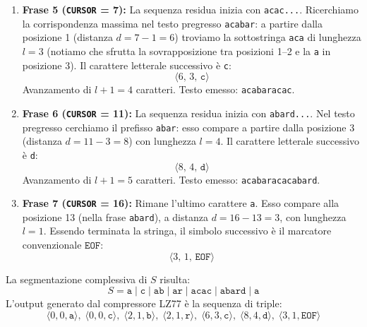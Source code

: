\begin{enumerate}
  \item \textbf{Frase 5 (\texttt{CURSOR} = 7):} La sequenza residua inizia con \texttt{acac...}. Ricerchiamo la corrispondenza massima nel testo pregresso \texttt{acabar}: a partire dalla posizione 1 (distanza $d = 7 - 1 = 6$) troviamo la sottostringa \texttt{aca} di lunghezza $l = 3$ (notiamo che sfrutta la sovrapposizione tra posizioni 1--2 e la \texttt{a} in posizione 3). Il carattere letterale successivo \`e \texttt{c}:
  \begin{equation*}
    \langle 6, \, 3, \, \texttt{c} \rangle
  \end{equation*}
  Avanzamento di $l + 1 = 4$ caratteri. Testo emesso: \texttt{acabaracac}.

  \item \textbf{Frase 6 (\texttt{CURSOR} = 11):} La sequenza residua inizia con \texttt{abard...}. Nel testo pregresso cerchiamo il prefisso \texttt{abar}: esso compare a partire dalla posizione 3 (distanza $d = 11 - 3 = 8$) con lunghezza $l = 4$. Il carattere letterale successivo \`e \texttt{d}:
  \begin{equation*}
    \langle 8, \, 4, \, \texttt{d} \rangle
  \end{equation*}
  Avanzamento di $l + 1 = 5$ caratteri. Testo emesso: \texttt{acabaracacabard}.

  \item \textbf{Frase 7 (\texttt{CURSOR} = 16):} Rimane l'ultimo carattere \texttt{a}. Esso compare alla posizione 13 (nella frase \texttt{abard}), a distanza $d = 16 - 13 = 3$, con lunghezza $l = 1$. Essendo terminata la stringa, il simbolo successivo \`e il marcatore convenzionale $\texttt{EOF}$:
  \begin{equation*}
    \langle 3, \, 1, \, \texttt{EOF} \rangle
  \end{equation*}
\end{enumerate}

La segmentazione complessiva di $S$ risulta:
\begin{equation}
  S = \texttt{a} \;|\; \texttt{c} \;|\; \texttt{ab} \;|\; \texttt{ar} \;|\; \texttt{acac} \;|\; \texttt{abard} \;|\; \texttt{a}
\end{equation}
L'output generato dal compressore LZ77 \`e la sequenza di triple:
\begin{equation}
  \langle 0, 0, \texttt{a} \rangle, \; \langle 0, 0, \texttt{c} \rangle, \; \langle 2, 1, \texttt{b} \rangle, \; \langle 2, 1, \texttt{r} \rangle, \; \langle 6, 3, \texttt{c} \rangle, \; \langle 8, 4, \texttt{d} \rangle, \; \langle 3, 1, \texttt{EOF} \rangle
\end{equation}

